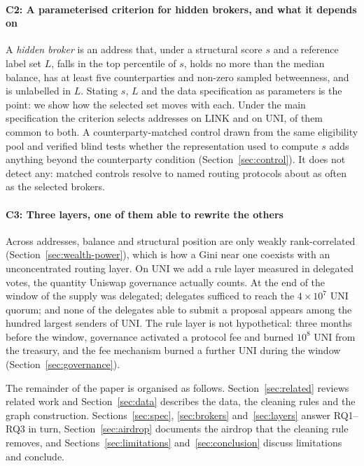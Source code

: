 \paragraph{C2: A parameterised criterion for hidden brokers, and what it
depends on}
A \emph{hidden broker} is an address that, under a structural score $s$ and
a reference label set $L$, falls in the top percentile of $s$, holds no
more than the median balance, has at least five counterparties and
non-zero sampled betweenness, and is unlabelled in $L$. Stating $s$, $L$
and the data specification as parameters is the point: we show how the
selected set moves with each. Under the main specification the criterion
selects  addresses on LINK and  on UNI,
 of them common to both. A counterparty-matched control
drawn from the same eligibility pool and verified blind tests whether the
representation used to compute $s$ adds anything beyond the counterparty
condition (Section~\ref{sec:control}). It does not detect any: matched
controls resolve to named routing protocols about as often as the selected
brokers.

\paragraph{C3: Three layers, one of them able to rewrite the others}
Across addresses, balance and structural position are only weakly
rank-correlated (Section~\ref{sec:wealth-power}), which is how a Gini near
one coexists with an unconcentrated routing layer. On UNI we add a rule
layer measured in delegated votes, the quantity Uniswap governance actually
counts. At the end of the window  of the supply was
delegated;  delegates sufficed to reach the
$4\times10^{7}$ UNI quorum; and none of the 
delegates able to submit a proposal appears among the hundred largest
senders of UNI. The rule layer is not hypothetical: three months before the
window, governance activated a protocol fee and burned $10^{8}$ UNI from
the treasury, and the fee mechanism burned a further 
UNI during the window (Section~\ref{sec:governance}).

The remainder of the paper is organised as follows.
Section~\ref{sec:related} reviews related work and Section~\ref{sec:data}
describes the data, the cleaning rules and the graph construction.
Sections~\ref{sec:spec}, \ref{sec:brokers} and~\ref{sec:layers} answer
RQ1--RQ3 in turn, Section~\ref{sec:airdrop} documents the airdrop that the
cleaning rule removes, and Sections~\ref{sec:limitations}
and~\ref{sec:conclusion} discuss limitations and conclude.
